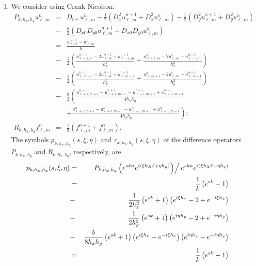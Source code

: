 \documentclass{article}
\begin{document}
\begin{enumerate}
\begin{enumerate}
\item We consider using Crank-Nicolson:
\begin{eqnarray*}
P_{k,h_x,h_y} u^n_{\ell,m}
& = & D_{t+} u^n_{\ell,m}
    - \frac{1}{2} \left( D_x^2 u^{n+1}_{\ell,m} + D_x^2 u^n_{\ell,m} \right)
    - \frac{1}{2} \left( D_y^2 u^{n+1}_{\ell,m} + D_y^2 u^n_{\ell,m} \right) \\
& - & \frac{b}{2} \left( D_{x0} D_{y0} u^{n+1}_{\ell,m} + D_{x0} D_{y0} u^n_{\ell,m} \right) \\
& = & \frac{u^{n+1}_{\ell,m} - u^n_{\ell,m}}{k} \\
& - & \frac{1}{2} \left( \frac{u^{n+1}_{\ell+1,m} - 2u^{n+1}_{\ell,m} + u^{n+1}_{\ell-1,m}}{h_x^2}
                       + \frac{u^n_{\ell+1,m} - 2u^n_{\ell,m} + u^{n+1}_{\ell-1,m}}{h_x^2} \right) \\
& - & \frac{1}{2} \left( \frac{u^{n+1}_{\ell,m+1} - 2u^{n+1}_{\ell,m} + u^{n+1}_{\ell,m-1}}{h_y^2}
                       + \frac{u^n_{\ell,m+1} - 2u^n_{\ell,m} + u^{n+1}_{\ell,m-1}}{h_y^2} \right) \\
& - & \frac{b}{2} \left( \frac{u^{n+1}_{\ell+1,m+1} - u^{n+1}_{\ell+1,m-1} - u^{n+1}_{\ell-1,m+1} + u^{n+1}_{\ell-1,m-1}}{4h_xh_y} \right. \\
&   &           + \left. \frac{u^n_{\ell+1,m+1} - u^n_{\ell+1,m-1} - u^n_{\ell-1,m+1} + u^n_{\ell-1,m-1}}{4h_xh_y} \right); \\
R_{k,h_x,h_y} f^n_{\ell,m}
& = & \frac{1}{2} \left( f^{n+1}_{\ell,m} + f^n_{\ell,m} \right).
\end{eqnarray*}
The symbols \(p_{k,h_x,h_y}(s,\xi,\eta)\) and \(r_{k,h_x,h_y}(s,\xi,\eta)\) of the difference operators \(P_{k,h_x,h_y}\) and \(R_{k,h_x,h_y}\), respectively, are
\begin{eqnarray*}
p_{k,h_x,h_y}(s,\xi,\eta)
& = & \left. P_{k,h_x,h_y} \left( e^{skn} e^{i(\xi h_X\ell + \eta h_y)} \right) \right/ e^{skn} e^{i(\xi h_X\ell + \eta h_y)} \\
& = & \frac{1}{k} \left( e^{sk} - 1 \right) \\
& - & \frac{1}{2h_x^2} \left( e^{sk} + 1 \right) \left( e^{i\xi h_x} - 2 + e^{-i\xi h_x} \right) \\
& - & \frac{1}{2h_y^2} \left( e^{sk} + 1 \right) \left( e^{i\eta h_y} - 2 + e^{-i\eta h_y} \right) \\
& - & \frac{b}{8h_xh_y} \left( e^{sk} + 1 \right) \left( e^{i\xi h_x} - e^{-i\xi h_x} \right) \left( e^{i\eta h_y} - e^{-i\eta h_y} \right) \\
& = & \frac{1}{k} \left( e^{sk} - 1 \right) \\

\end{eqnarray*}
\end{enumerate}
\end{enumerate}
\end{document}

